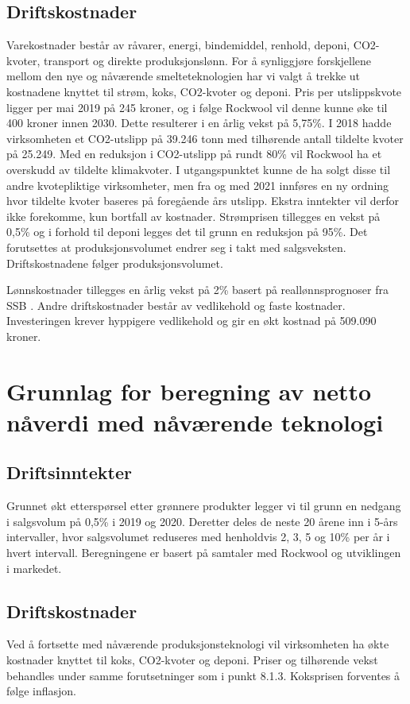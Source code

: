 \subsection{Driftskostnader}
Varekostnader består av råvarer, energi, bindemiddel, renhold, deponi, CO2-kvoter, transport og direkte produksjonslønn. For å synliggjøre forskjellene mellom den nye og nåværende smelteteknologien har vi valgt å trekke ut kostnadene knyttet til strøm, koks, CO2-kvoter og deponi. Pris per utslippskvote ligger per mai 2019 på 245 kroner, og i følge Rockwool vil denne kunne øke til 400 kroner innen 2030. Dette resulterer i en årlig vekst på 5,75\%. I 2018 hadde virksomheten et CO2-utslipp på 39.246 tonn med tilhørende antall tildelte kvoter på 25.249. Med en reduksjon i CO2-utslipp på rundt 80\% vil Rockwool ha et overskudd av tildelte klimakvoter. I utgangspunktet kunne de ha solgt disse til andre kvotepliktige virksomheter, men fra og med 2021 innføres en ny ordning hvor tildelte kvoter baseres på foregående års utslipp. Ekstra inntekter vil derfor ikke forekomme, kun bortfall av kostnader. Strømprisen tillegges en vekst på 0,5\% og i forhold til deponi legges det til grunn en reduksjon på 95\%. Det forutsettes at produksjonsvolumet endrer seg i takt med salgsveksten. Driftskostnadene følger produksjonsvolumet.

\indent \newline
Lønnskostnader tillegges en årlig vekst på 2\% basert på reallønnsprognoser fra SSB \cite{reallonnsprognoser}.
Andre driftskostnader består av vedlikehold og faste kostnader. Investeringen krever hyppigere vedlikehold og gir en økt kostnad på 509.090 kroner.

\section{Grunnlag for beregning av netto nåverdi med nåværende teknologi}
\subsection{Driftsinntekter}
Grunnet økt etterspørsel etter grønnere produkter legger vi til grunn en nedgang i salgsvolum på 0,5\% i 2019 og 2020. Deretter deles de neste 20 årene inn i 5-års intervaller, hvor salgsvolumet reduseres med henholdvis 2, 3, 5 og 10\% per år i hvert intervall. Beregningene er basert på samtaler med Rockwool og utviklingen i markedet. 

\subsection{Driftskostnader}
Ved å fortsette med nåværende produksjonsteknologi vil virksomheten ha økte kostnader knyttet til koks, CO2-kvoter og deponi. Priser og tilhørende vekst behandles under samme forutsetninger som i punkt 8.1.3. Koksprisen forventes å følge inflasjon.

